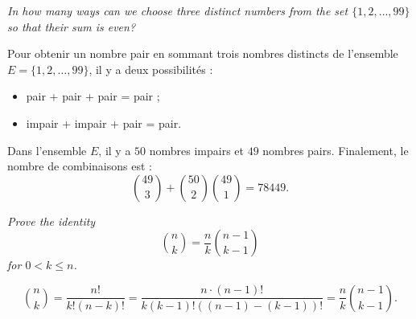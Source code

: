 \begin{description}
   {\itshape In how many ways can we choose three distinct numbers from the set $\{1, 2,\ldots, 99\}$ so that their sum is even?}
    \begin{ex}
      Pour obtenir un nombre pair en sommant trois nombres distincts de l'ensemble $E = \{1, 2, \ldots, 99\}$, il y a deux possibilit\'es :
      \begin{itemize}
        \item pair + pair + pair = pair ;
        \item impair + impair + pair = pair.
      \end{itemize}
      Dans l'ensemble $E$, il y a $50$ nombres impairs et $49$ nombres pairs. Finalement, le nombre de combinaisons est :
      \[ \binom{49}{3} + \binom{50}{2}\binom{49}{1} = 78449.  \]
      
    \end{ex}
   {\itshape Prove the identity \[\binom{n}{k} = \frac{n}{k}\binom{n-1}{k-1}\] for $ 0 < k \le n$.}

    \begin{ex}
      \[ \binom{n}{k} = \frac{n!}{k!(n-k)!} = \frac{n\cdot(n-1)!}{k(k-1)!((n-1)-(k-1))!} = \frac{n}{k}\binom{n-1}{k-1}.\]
    \end{ex}


\end{description}
